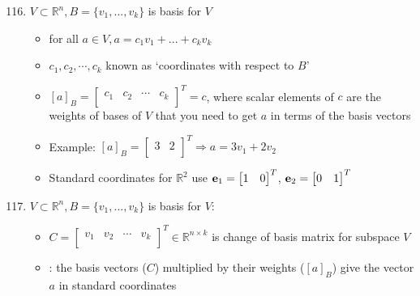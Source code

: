 \documentclass[10pt,letterpaper]{article}
\begin{document}
\begin{enumerate}
\setcounter{enumi}{115}
\item  $V \subset \mathbb{R}^{n}, B=\{v_1,...,v_k\}$ is basis for $V$

\begin{itemize}
\item for all $a \in V, a= c_1 v_1 + ... + c_k v_k$
\item $c_1,c_2,\cdots,c_k$ known as `coordinates with respect to $B$'
\item $[a]_B= \begin{bmatrix}
                   c_1 & c_2 & \cdots & c_k \\
                   \end{bmatrix} ^{T} = c$, where scalar elements of $c$ are the weights of bases of $V$ that you need to get $a$ in terms of the basis vectors
\item Example: $[a]_B = \begin{bmatrix}
                           3 & 2 \\     
                         \end{bmatrix}  ^T \Rightarrow a=3 v_1 + 2 v_2$
\item Standard coordinates for $\mathbb{R}^{2}$  use ${\bf e}_1 = \begin{bmatrix}    
                                               1 & 0 \\         
                                             \end{bmatrix} ^{T}$, ${\bf e} _2 = \begin{bmatrix}    
                                                                                0 & 1 \\         
                                                                              \end{bmatrix} ^{T}$
\end{itemize}

\item $V \subset \mathbb{R}^{n}, B=\{v_1,...,v_k\}$ is basis for $V$:

\begin{itemize}
\item $C = \begin{bmatrix}              
              v_1 & v_2 & \cdots & v_k \\
            \end{bmatrix} ^{T} \in \mathbb{R}^{n \times k}$ is change of basis matrix for subspace $V$
\item {}: the basis vectors ($C$) multiplied by their weights ($[a]_B$) give the vector $a$ in standard coordinates
\end{itemize}


\end{enumerate}
\end{document}
